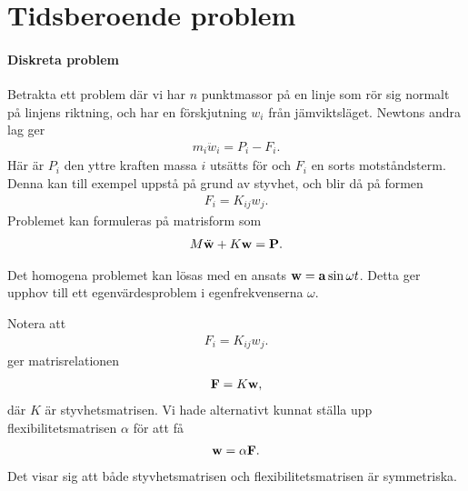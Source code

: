 \section{Tidsberoende problem}

\paragraph{Diskreta problem}
Betrakta ett problem där vi har $n$ punktmassor på en linje som rör sig normalt på linjens riktning, och har en förskjutning $w_{i}$ från jämviktsläget. Newtons andra lag ger
\begin{align*}
	m_{i}\ddot{w}_{i} = P_{i} - F_{i}.
\end{align*}
Här är $P_{i}$ den yttre kraften massa $i$ utsätts för och $F_{i}$ en sorts motståndsterm. Denna kan till exempel uppstå på grund av styvhet, och blir då på formen
\begin{align*}
	F_{i} = K_{ij}w_{j}.
\end{align*}
Problemet kan formuleras på matrisform som
\begin{align*}
	M\ddot{\vb{w}} + K\vb{w} = \vb{P}.
\end{align*}

Det homogena problemet kan lösas med en ansats $\vb{w} = \vb{a}\sin{\omega t}$. Detta ger upphov till ett egenvärdesproblem i egenfrekvenserna $\omega$.

Notera att 
\begin{align*}
	F_{i} = K_{ij}w_{j}.
\end{align*}
ger matrisrelationen
\begin{align*}
	\vb{F} = K\vb{w},
\end{align*}
där $K$ är styvhetsmatrisen. Vi hade alternativt kunnat ställa upp flexibilitetsmatrisen $\alpha$ för att få
\begin{align*}
	\vb{w} = \alpha\vb{F}.
\end{align*}
Det visar sig att både styvhetsmatrisen och flexibilitetsmatrisen är symmetriska.